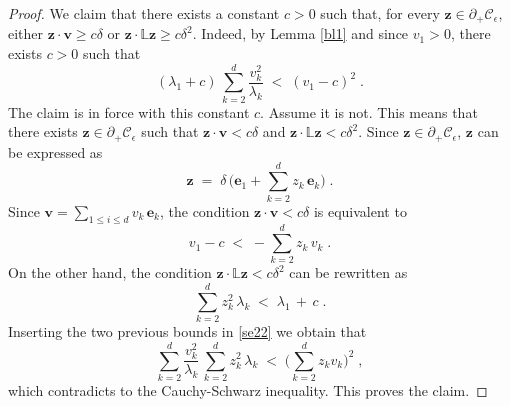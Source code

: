 \documentclass[reqno]{amsart}
\newcounter{as}[section]
\newcommand{\mc}[1]{{\mathcal #1}}
\newcommand{\bb}[1]{{\mathbb #1}}
\newcommand{\bs}[1]{{\boldsymbol #1}}
\newcommand{\<}{\langle}
\renewcommand{\>}{\rangle}
\begin{document}
\begin{proof}
We claim that there exists a constant $c>0$ such that, for every
$\bs{z}\in\partial_{+}\mc{C}_{\epsilon}$, either $\bs{z}\cdot\bs{v}\ge
c\delta$ or $\bs{z}\cdot\bb{L}\bs{z}\ge c\delta^{2}$. Indeed,
by Lemma \ref{bl1} and since $v_1>0$, there exists $c>0$ such that
\begin{equation}
\label{se22}
(\lambda_{1}+c) \, \sum_{k=2}^{d}\frac{v_{k}^{2}}{\lambda_{k}}
\;<\;(v_{1}-c)^{2}\;.
\end{equation}
The claim is in force with this constant $c$. Assume it is not. This
means that there exists $\bs{z}\in\partial_{+}\mc{C}_{\epsilon}$ such
that $\bs{z}\cdot\bs{v} < c\delta$ and $\bs{z}\cdot\bb{L}\bs{z} <
c\delta^{2}$. Since $\bs{z}\in\partial_{+} \mc{C}_{\epsilon}$,
$\bs{z}$ can be expressed as
\begin{equation*}
\bs{z}\;=\;\delta \, \Big(\bs{e}_{1} +
\sum_{k=2}^{d} z_{k} \, \bs{e}_{k}\Big)\;.
\end{equation*}
Since $\bs{v}=\sum_{1\le i \le d} v_{k}\, \bs{e}_{k}$, the condition
$\bs{z}\cdot\bs{v}<c\delta$ is equivalent to
\begin{equation*}
v_{1}-c\;<\;-\sum_{k=2}^{d}z_{k}\, v_{k}\;.
\end{equation*}
On the other hand, the condition $\bs{z}\cdot\bb{L}\bs{z}<c\delta^{2}$
can be rewritten as
\begin{equation*}
\sum_{k=2}^{d} z^2_{k} \, \lambda_{k}\;<\;\lambda_{1} \,+\, c\;.
\end{equation*}
Inserting the two previous bounds in \eqref{se22} we obtain that
\begin{equation*}
\sum_{k=2}^{d}\frac{v_{k}^{2}}{\lambda_{k}}\,
\sum_{k=2}^{d}z^2_{k}\, \lambda_{k}\;<\;\Big(\sum_{k=2}^{d}z_{k}v_{k}\Big)^{2}\;,
\end{equation*}
which contradicts to the Cauchy-Schwarz inequality. This proves the
claim.


\end{proof}
\end{document}
